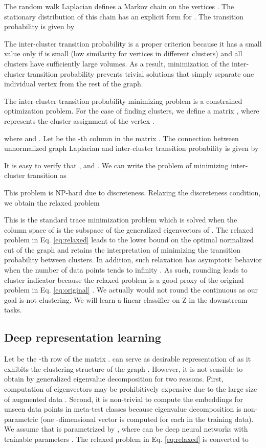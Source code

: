 \documentclass{article}
\begin{document}
The random walk Laplacian  defines a Markov chain on the vertices . The stationary distribution  of this chain has an explicit form  for  \citep{meila:shi:2000learning}. The transition probability  is given by 

The inter-cluster transition probability is a proper criterion because it has a small value only if   is small (low similarity for vertices in different clusters) and all clusters have sufficiently large volumes. As a result, minimization of the inter-cluster transition probability prevents trivial solutions that simply separate one individual vertex from the rest of the graph.

The inter-cluster transition probability minimizing problem is a constrained optimization problem. For the case of finding  clusters, we define a matrix , where  represents the cluster assignment of the vertex . 

where  and  . Let  be the -th column in the matrix . The connection between unnormalized graph Laplacian and inter-cluster transition probability is given by

It is easy to verify that , and . We can write the problem of minimizing inter-cluster transition as 

This problem is NP-hard due to discreteness. Relaxing the discreteness condition, we obtain the relaxed problem

This is the standard trace minimization problem which is solved when the column space of  is the subspace of the  generalized eigenvectors of . The relaxed problem in Eq. \eqref{eq:relaxed} leads to the lower bound on the optimal normalized cut of the graph \citep{chan:etal:1994spectral,zha:etal:2001spectral} and retains the interpretation of minimizing the transition probability between clusters.  In addition, such relaxation has asymptotic behavior when the number of data points tends to infinity \citep{luxburg:etal:2004limits}. As such, rounding  leads to cluster indicator because the relaxed problem is a good proxy of the original problem in Eq. \eqref{eq:original} \citep{bach:Jordan:2006learning}.  We actually would not round the continuous  as our goal is not clustering. We will learn a linear classifier on Z in the downstream tasks.

\subsection{Deep representation learning}
Let  be the -th row of the matrix .  can serve as desirable representation of  as it exhibits the clustering structure of the graph . However, it is not sensible to obtain  by generalized eigenvalue decomposition for two reasons. First, computation of eigenvectors may be prohibitively expensive due to the large size of augmented data . Second, it is non-trivial to compute the embeddings for unseen data points in meta-test classes because eigenvalue decomposition is non-parametric (one -dimensional vector  is computed for each  in the training data). We assume that  is parametrized by , where  can be deep neural networks with trainable parameters . The relaxed problem in Eq. \eqref{eq:relaxed} is converted to 
\end{document}
